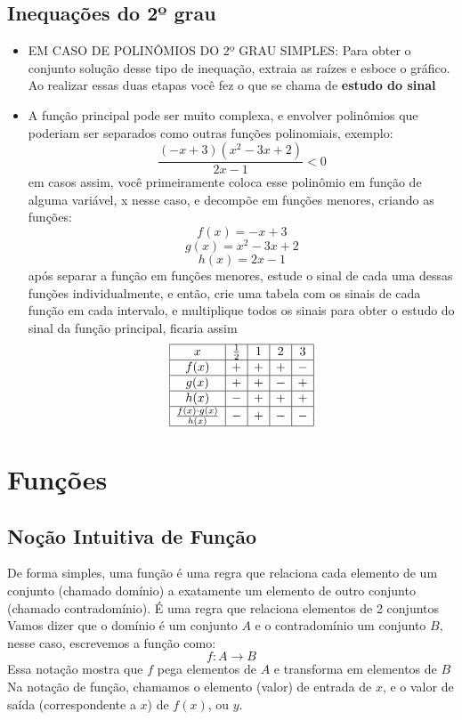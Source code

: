 \documentclass{article}
\begin{document}
\subsection{Inequações do 2º grau}
\begin{itemize}
    \item EM CASO DE POLINÔMIOS DO 2º GRAU SIMPLES: Para obter o conjunto solução desse tipo de inequação, extraia as raízes e esboce o gráfico. Ao realizar essas duas etapas você fez o que se chama de \textbf{estudo do sinal}
    \item  A função principal pode ser muito complexa, e envolver polinômios que poderiam ser separados como outras funções polinomiais, exemplo: \[
\frac{(-x + 3)(x^2 - 3x + 2)}{2x - 1} < 0
\] em casos assim, você primeiramente coloca esse polinômio em função de alguma variável, x nesse caso, e decompõe em funções menores, criando as funções: \[
f(x) = -x + 3
\]
\[
g(x) = x^2 - 3x + 2
\]
\[
h(x) = 2x - 1
\] após separar a função em funções menores, estude o sinal de cada uma dessas funções individualmente, e então, crie uma tabela com os sinais de cada função em cada intervalo, e multiplique todos os sinais para obter o estudo do sinal da função principal, ficaria assim
\[
\begin{array}{|c|c|c|c|c|c|}
\hline
x & \frac{1}{2} & 1 & 2 & 3 \\ \hline
f(x) & + & + & + & - \\ \hline
g(x) & + & + & - & + \\ \hline
h(x) & - & + & + & + \\ \hline
\frac{f(x) \cdot g(x)}{h(x)} & - & + & - & - \\ \hline
\end{array}
\]
\end{itemize}

\section{Funções}

\subsection{Noção Intuitiva de Função}
De forma simples, uma função é uma regra que relaciona cada elemento de um conjunto (chamado domínio) a exatamente um elemento de outro conjunto (chamado contradomínio). É uma regra que relaciona elementos de 2 conjuntos
\\[5pt]
Vamos dizer que o domínio é um conjunto $A$ e o contradomínio um conjunto $B$, nesse caso, escrevemos a função como:
\[
f: A \to B
\]
Essa notação mostra que $f$ pega elementos de $A$ e transforma em elementos de $B$
\\[5pt]
Na notação de função, chamamos o elemento (valor) de entrada de $x$, e o valor de saída (correspondente a $x$) de $f(x)$, ou $y$.
\\[10pt]
\end{document}

